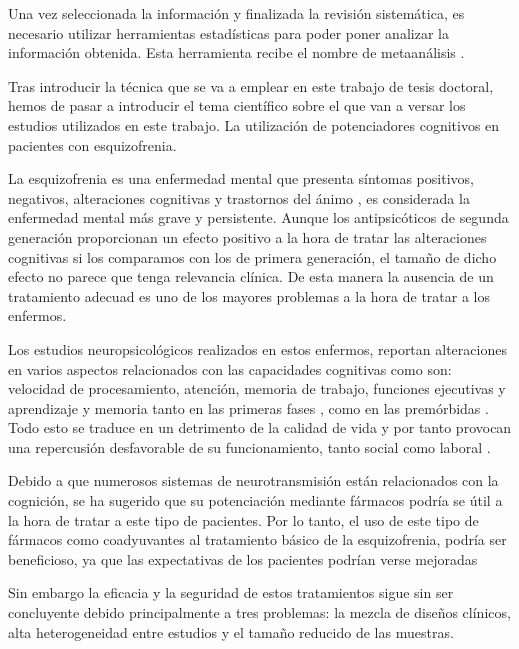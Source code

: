 \documentclass[a4paper,openright,12pt]{report}
\begin{document}
Una vez seleccionada la información y finalizada la revisión sistemática, es necesario utilizar herramientas estadísticas para poder poner analizar la información obtenida. Esta herramienta recibe el nombre de metaanálisis \cite{Cochrane_man}.

Tras introducir la técnica que se va a emplear en este trabajo de tesis doctoral, hemos de pasar a introducir el tema científico sobre el que van a versar los estudios utilizados en este trabajo. La utilización de potenciadores cognitivos en pacientes con esquizofrenia.

La esquizofrenia es una enfermedad mental que presenta síntomas positivos, negativos, alteraciones cognitivas y trastornos del ánimo \cite{DSMIV1994}, es considerada la enfermedad mental más grave y persistente. Aunque los antipsicóticos de segunda generación proporcionan un efecto positivo a la hora de tratar las alteraciones cognitivas si los comparamos con los de primera generación, el tamaño de dicho efecto no parece que tenga relevancia clínica. De esta manera la ausencia de un tratamiento adecuad es uno de los mayores problemas a la hora de tratar a los enfermos.

Los estudios neuropsicológicos realizados en estos enfermos, reportan alteraciones en varios aspectos relacionados con las capacidades cognitivas como son: velocidad de procesamiento, atención, memoria de trabajo, funciones ejecutivas y aprendizaje y memoria tanto en las primeras fases \cite{Zabala2009}, como en las premórbidas \cite{Reichenberg2009}. Todo esto se traduce en un detrimento de la calidad de vida y por tanto provocan una repercusión desfavorable de su funcionamiento, tanto social como laboral \cite{Green2006}.

Debido a que numerosos sistemas de neurotransmisión están relacionados con la cognición, se ha sugerido que su potenciación mediante fármacos podría se útil a la hora de tratar a este tipo de pacientes. Por lo tanto, el uso de este tipo de fármacos como coadyuvantes al tratamiento básico de la esquizofrenia, podría ser beneficioso, ya que las expectativas de los pacientes podrían verse mejoradas \cite{Harvey2009}

Sin embargo la eficacia y la seguridad de estos tratamientos sigue sin ser concluyente debido principalmente a tres problemas: la mezcla de diseños clínicos, alta heterogeneidad entre estudios y el tamaño reducido de las muestras. 
\end{document}
